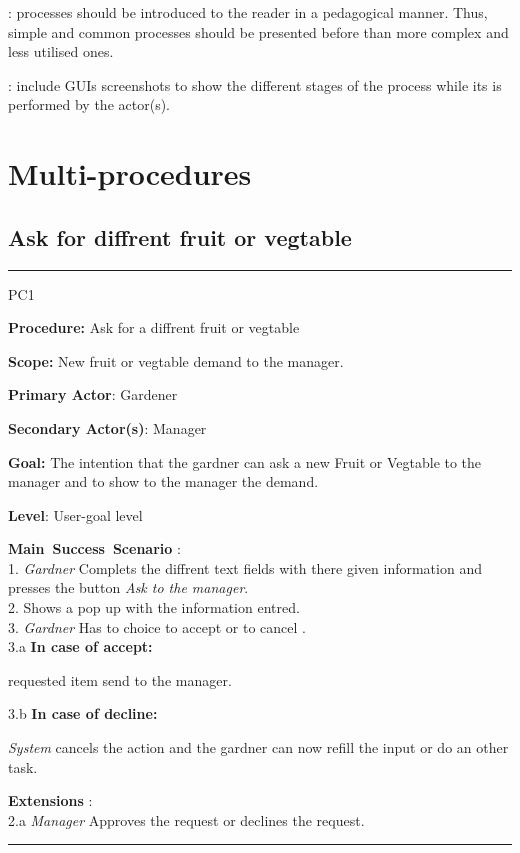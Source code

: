 : processes should be introduced to the
reader in a pedagogical manner. Thus, simple and common processes should be presented before
than more complex and less utilised ones.

: include GUIs screenshots to show the
different stages of the process while its is performed by the actor(s).






\section{Multi-procedures}


\subsection{Ask for diffrent fruit or vegtable}
\vspace{0.5cm}
\hrule
\hfill \break
\begin{lyxlist}{PC1}
\small{
\item [\textbf{Procedure:}] Ask for a diffrent fruit or vegtable
\item [\textbf{Scope:}] New fruit or vegtable demand to the manager.
\item [\textbf{Primary Actor}:] Gardener
\item [\textbf{Secondary Actor(s)}:] Manager
\item [\textbf{Goal:}] The intention that the gardner can ask a new Fruit or
Vegtable to the manager and to show to the manager the demand.
\item [\textbf{Level}:] User-goal level
\item [\textbf{Main~Success~Scenario}]:\\
1. \emph{Gardner} Complets the diffrent text fields with there given
information and presses the button \emph{Ask to the manager}. \\
2. Shows a pop up with the information entred.\\
3. \emph{Gardner} Has to choice to accept or to cancel .\\
	3.a \textbf{In case of accept:}
		\begin{Tab}{2em}  requested item send to the manager.\end{Tab}
	3.b \textbf{In case of decline:}
		\begin{Tab}{2em} \emph{System} cancels the action and the gardner can
		now refill the input or do an other task. \end{Tab}
\item [\textbf{Extensions}]:\\
2.a  \emph{Manager} Approves the request or declines the request.\\
}
\end{lyxlist}
\hrule
\vspace{0.5cm}






